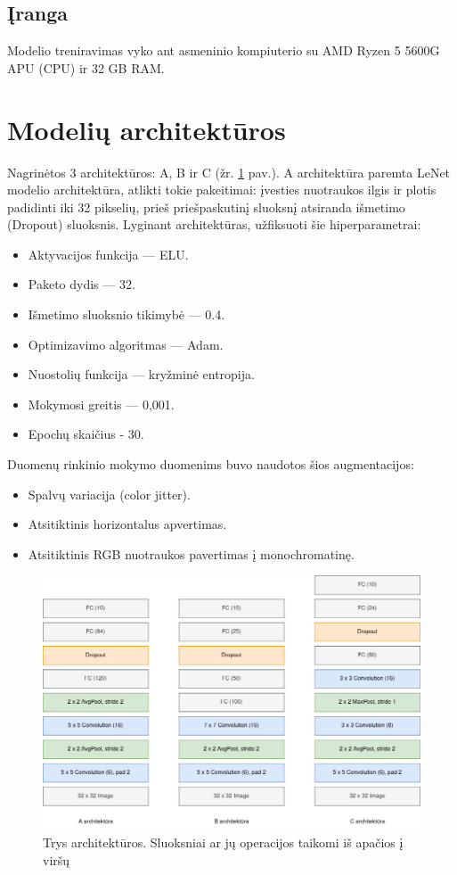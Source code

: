 \documentclass{VUMIFPSbakalaurinis}
\begin{document}
\subsection{Įranga}
Modelio treniravimas vyko ant asmeninio kompiuterio su
AMD Ryzen 5 5600G APU (CPU) ir 32 GB RAM.

\section{Modelių architektūros}

Nagrinėtos 3 architektūros: A, B ir C (žr. \ref{img:arch-list} pav.).
A architektūra paremta LeNet modelio architektūra, atlikti
tokie pakeitimai: įvesties nuotraukos ilgis ir plotis padidinti
iki 32 pikselių, prieš priešpaskutinį sluoksnį atsiranda 
išmetimo (Dropout) sluoksnis. Lyginant architektūras, užfiksuoti šie hiperparametrai:
\begin{itemize}
  \item Aktyvacijos funkcija — ELU.
  \item Paketo dydis —  32.
  \item Išmetimo sluoksnio tikimybė —  0.4.
  \item Optimizavimo algoritmas — Adam.
  \item Nuostolių funkcija — kryžminė entropija.
  \item Mokymosi greitis — 0,001.
  \item Epochų skaičius - 30.
\end{itemize} 

\noindent Duomenų rinkinio mokymo duomenims buvo naudotos šios
augmentacijos:
\begin{itemize}
  \item Spalvų variacija (color jitter).
  \item Atsitiktinis horizontalus apvertimas.
  \item Atsitiktinis RGB nuotraukos pavertimas į monochromatinę.
\end{itemize}

\begin{figure}[H]
  \centering
  \includegraphics[scale=0.5]{img/arch-list.jpg}
  \caption{Trys architektūros. Sluoksniai ar jų operacijos
  taikomi iš apačios į viršų}
  \label{img:arch-list}
\end{figure}
\end{document}
